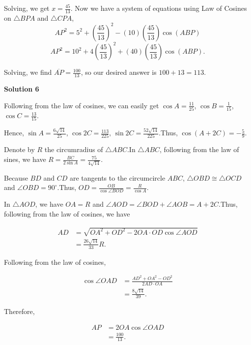 \begin{enumerate}
 Solving, we get $x=\frac{45}{13}.$ Now we have a system of equations using Law of Cosines on $\triangle BPA$ and $\triangle CPA$, 
 \[AP^2=5^2+\left(\frac{45}{13}\right)^2 -(10) \left(\frac{45}{13} \right)\cos(ABP)\]
 \[AP^2=10^2+4 \left(\frac{45}{13} \right)^2 + (40) \left(\frac{45}{13} \right)\cos(ABP).\]

 Solving, we find $\overline{AP}=\frac{100}{13}$, so our desired answer is $100+13=\boxed{113}$.

 



\textbf{Solution 6}

Following from the law of cosines, we can easily get $\cos A = \frac{11}{25}$, $\cos B = \frac{1}{15}$, $\cos C = \frac{13}{15}$.

 Hence, $\sin A = \frac{6 \sqrt{14}}{25}$, $\cos 2C = \frac{113}{225}$, $\sin 2C = \frac{52 \sqrt{14}}{225}$.Thus, $\cos \left( A + 2C \right) = - \frac{5}{9}$.

 Denote by $R$ the circumradius of $\triangle ABC$.In $\triangle ABC$, following from the law of sines, we have $R = \frac{BC}{2 \sin A} = \frac{75}{4 \sqrt{14}}$.

 Because $BD$ and $CD$ are tangents to the circumcircle $ABC$, $\triangle OBD \cong \triangle OCD$ and $\angle OBD = 90^\circ$.Thus, $OD = \frac{OB}{\cos \angle BOD} = \frac{R}{\cos A}$.

 In $\triangle AOD$, we have $OA = R$ and $\angle AOD = \angle BOD + \angle AOB = A + 2C$.Thus, following from the law of cosines, we have

 \begin{align*}AD & = \sqrt{OA^2 + OD^2 - 2 OA \cdot OD \cos \angle AOD} \\& = \frac{26 \sqrt{14}}{33} R.\end{align*}


 
Following from the law of cosines,

 \begin{align*}\cos \angle OAD & = \frac{AD^2 + OA^2 - OD^2}{2 AD \cdot OA} \\& = \frac{8 \sqrt{14}}{39} .\end{align*}


 
Therefore,

 \begin{align*}AP & = 2 OA \cos \angle OAD \\& = \frac{100}{13} .\end{align*}



\end{enumerate}
